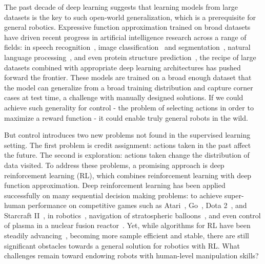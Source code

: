 
The past decade of deep learning suggests that learning models from large datasets is the key to such open-world generalization, which is a prerequisite for general robotics.
Expressive function approximation trained on broad datasets have driven recent progress in artificial intelligence research across a range of fields: in speech recognition~\citep{Graves2014}, image classification~\citep{krizhevsky2012imagenet} and segmentation~\citep{ren2015fasterrcnn}, natural language processing~\citep{devlin2019bert}, and even protein structure prediction~\citep{jumper2021alphafold}, the recipe of large datasets combined with appropriate deep learning architectures has pushed forward the frontier.
These models are trained on a broad enough dataset that the model can generalize from a broad training distribution and capture corner cases at test time, a challenge with manually designed solutions.
If we could achieve such generality for control - the problem of selecting actions in order to maximize a reward function - it could enable truly general robots in the wild.

But control introduces two new problems not found in the supervised learning setting.
The first problem is credit assignment: actions taken in the past affect the future.
The second is exploration: actions taken change the distribution of data visited.
To address these problems, a promising approach is deep reinforcement learning (RL), which combines reinforcement learning with deep function approximation.
Deep reinforcement learning has been applied successfully on many sequential decision making problems: to achieve super-human performance on competitive games such as Atari~\citep{mnih2015human}, Go~\citep{silver2016alphago}, Dota 2~\citep{openai2019dota}, and Starcraft II~\citep{vinyals2019starcraft}, in robotics~\citep{deisenroth2011pilco, kober2013reinforcement, levine2017grasping, lee2020locomotion}, navigation of stratospheric balloons~\cite{bellemare2020loon}, and even control of plasma in a nuclear fusion reactor~\cite{degrave2022fusion}.
Yet, while algorithms for RL have been steadily advancing~\citep{schulman2015trpo, lillicrap2015continuous, schulman2017ppo, haarnoja2018sac}, becoming more sample efficient and stable, there are still significant obstacles towards a general solution for robotics with RL.
What challenges remain toward endowing robots with human-level manipulation skills?

